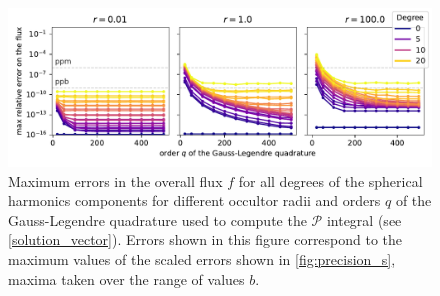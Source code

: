 \documentclass[modern]{aastex631}
\begin{document}
\begin{figure}[H]
    \begin{center}
        \includegraphics[width=\textwidth]{../workflows/precision/figures/error_order_degree.pdf}
        \caption{Maximum errors in the overall flux $f$ for all degrees of the spherical harmonics components for different occultor radii and orders $q$ of the Gauss-Legendre quadrature used to compute the $\mathcal{P}$ integral (see \autoref{solution_vector}). Errors shown in this figure correspond to the maximum values of the scaled errors shown in \autoref{fig:precision_s}, maxima taken over the range of values $b$. }
        \label{fig:precision_order_gausslegendre_degree}
    \end{center}
\end{figure}
\end{document}
